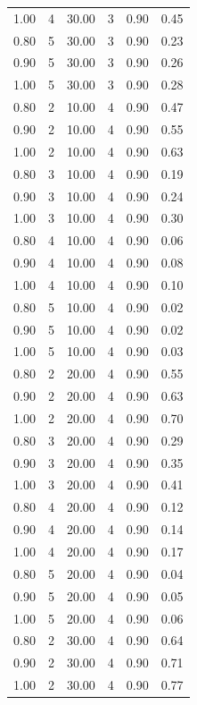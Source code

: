 \documentclass[12pt]{article}
\begin{document}
{{{{\begin{longtable}{cccccc}
  1.00 &   4 & 30.00 &   3 & 0.90 & 0.45 \\ 
  0.80 &   5 & 30.00 &   3 & 0.90 & 0.23 \\ 
  0.90 &   5 & 30.00 &   3 & 0.90 & 0.26 \\ 
  1.00 &   5 & 30.00 &   3 & 0.90 & 0.28 \\ 
  0.80 &   2 & 10.00 &   4 & 0.90 & 0.47 \\ 
  0.90 &   2 & 10.00 &   4 & 0.90 & 0.55 \\ 
  1.00 &   2 & 10.00 &   4 & 0.90 & 0.63 \\ 
  0.80 &   3 & 10.00 &   4 & 0.90 & 0.19 \\ 
  0.90 &   3 & 10.00 &   4 & 0.90 & 0.24 \\ 
  1.00 &   3 & 10.00 &   4 & 0.90 & 0.30 \\ 
  0.80 &   4 & 10.00 &   4 & 0.90 & 0.06 \\ 
  0.90 &   4 & 10.00 &   4 & 0.90 & 0.08 \\ 
  1.00 &   4 & 10.00 &   4 & 0.90 & 0.10 \\ 
  0.80 &   5 & 10.00 &   4 & 0.90 & 0.02 \\ 
  0.90 &   5 & 10.00 &   4 & 0.90 & 0.02 \\ 
  1.00 &   5 & 10.00 &   4 & 0.90 & 0.03 \\ 
  0.80 &   2 & 20.00 &   4 & 0.90 & 0.55 \\ 
  0.90 &   2 & 20.00 &   4 & 0.90 & 0.63 \\ 
  1.00 &   2 & 20.00 &   4 & 0.90 & 0.70 \\ 
  0.80 &   3 & 20.00 &   4 & 0.90 & 0.29 \\ 
  0.90 &   3 & 20.00 &   4 & 0.90 & 0.35 \\ 
  1.00 &   3 & 20.00 &   4 & 0.90 & 0.41 \\ 
  0.80 &   4 & 20.00 &   4 & 0.90 & 0.12 \\ 
  0.90 &   4 & 20.00 &   4 & 0.90 & 0.14 \\ 
  1.00 &   4 & 20.00 &   4 & 0.90 & 0.17 \\ 
  0.80 &   5 & 20.00 &   4 & 0.90 & 0.04 \\ 
  0.90 &   5 & 20.00 &   4 & 0.90 & 0.05 \\ 
  1.00 &   5 & 20.00 &   4 & 0.90 & 0.06 \\ 
  0.80 &   2 & 30.00 &   4 & 0.90 & 0.64 \\ 
  0.90 &   2 & 30.00 &   4 & 0.90 & 0.71 \\ 
  1.00 &   2 & 30.00 &   4 & 0.90 & 0.77 \\ 

\end{longtable}}}}}
\end{document}
